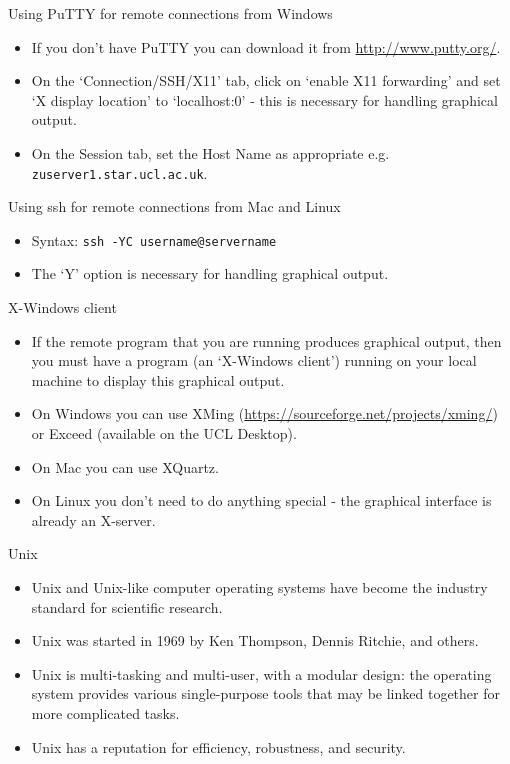 \documentclass[dvipsnames]{beamer}
\newcommand{\command}[1]{\colorbox{light-gray}{\texttt{#1}}}
\newcommand{\server}[1]{\textcolor{BrickRed}{\texttt{#1}}}
\begin{document}
\begin{frame}{Using PuTTY for remote connections from Windows}
  \begin{itemize}
    \item If you don't have PuTTY you can download it from \url{http://www.putty.org/}.
    \item On the `Connection/SSH/X11' tab, click on `enable X11 forwarding' and set `X display location' to `localhost:0' - this is necessary for handling graphical output.
    \item On the Session tab, set the Host Name as appropriate e.g. \server{zuserver1.star.ucl.ac.uk}.
  \end{itemize}
\end{frame}


\begin{frame}{Using ssh for remote connections from Mac and Linux}
  \begin{itemize}
    \item Syntax: \command{ssh -YC username@servername}
    \item The `Y' option is necessary for handling graphical output.
  \end{itemize}
\end{frame}


\begin{frame}{X-Windows client}
  \begin{itemize}
    \item If the remote program that you are running produces graphical output, then you must have a program (an `X-Windows client') running on your local machine to display this graphical output.
    \item On Windows you can use XMing (\url{https://sourceforge.net/projects/xming/}) or Exceed (available on the UCL Desktop).
    \item On Mac you can use XQuartz.
    \item On Linux you don't need to do anything special - the graphical interface is already an X-server.
  \end{itemize}
\end{frame}


\begin{frame}{Unix}
  \begin{itemize}
    \item Unix and Unix-like computer operating systems have become the industry standard for scientific research.
    \item Unix was started in 1969 by Ken Thompson, Dennis Ritchie, and others.
    \item Unix is multi-tasking and multi-user, with a modular design: the operating system provides various single-purpose tools that may be linked together for more complicated tasks.
    \item Unix has a reputation for efficiency, robustness, and security.
   \end{itemize}
\end{frame}
\end{document}
